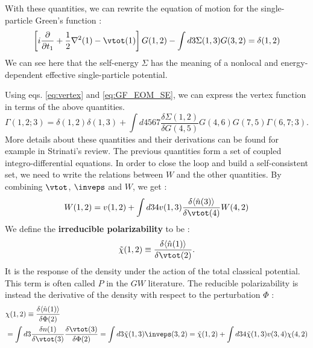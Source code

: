 With these quantities, we can rewrite the equation of motion for the single-particle Green's function :
\begin{equation}
	\left[ i \frac{\partial}{\partial t_1} + \frac{1}{2}\nabla^2(1) - \vtot (1)\right] G(1,2) - \int d3 \Sigma(1,3) G(3,2) = \delta(1,2) \label{eq:GF_EOM_SE}
\end{equation}
We can see here that the self-energy $\Sigma$ has the meaning of a nonlocal and energy-dependent effective single-particle potential.
%

Using eqs. \eqref{eq:vertex} and \eqref{eq:GF_EOM_SE}, we can express the vertex function in terms of the above quantities. 
\begin{equation}
	\Gamma(1,2;3) = \delta(1,2) \delta(1,3) + \int d4567 \frac{\delta \Sigma(1,2)}{\delta G(4,5)} G(4,6) G(7,5) \Gamma(6,7;3). \label{eq:vertex_hedin}
\end{equation}
More details about these quantities and their derivations can be found for example in Strinati's review\cite{strinati1988application}.
The previous quantities form a set of coupled integro-differential equations. In order to close the loop and build a self-consistent set, we need to write the relations between $W$ and the other quantities. By combining $\vtot$, $\inveps$ and $W$, we get :
\begin{equation}
	W(1,2) = v(1,2) + \int d34 v(1,3) \frac{\delta \langle \hat{n}(3)\rangle}{\delta \vtot (4)} W(4,2)
\end{equation}
We define the \textbf{irreducible polarizability} to be :
\begin{equation}
	\tilde{\chi}(1,2) \equiv \frac{\delta \langle \hat{n}(1)\rangle}{\delta \vtot (2)}. \label{eq:P_dn/dV}
\end{equation}
It is the response of the density under the action of the total classical potential. This term is often called $P$ in the $GW$ literature. The reducible polarizability is instead the derivative of the density with respect to the perturbation $\Phi$ :
\begin{align}
	&\chi(1,2) \equiv \frac{\delta \langle \hat{n}(1)\rangle}{\delta \Phi (2)}\\
	 &= \int d3 \frac{\delta n(1)}{\delta \vtot(3)} \frac{\delta \vtot(3)}{\delta \Phi (2)} = \int d3 \tilde{\chi}(1,3)\inveps(3,2) = \tilde{\chi}(1,2) + \int d34 \tilde{\chi}(1,3) v(3,4) \chi(4,2) \label{eq:chi_dn/dPhi}
\end{align}

